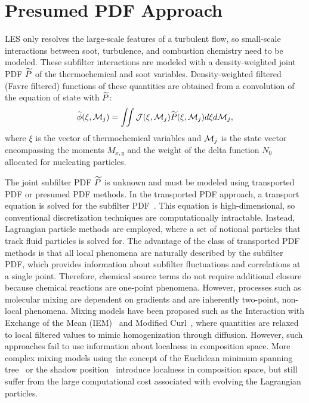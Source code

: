 \section{Presumed PDF Approach}
\label{sec:lesmodels:presumedpdf}

LES only resolves the large-scale features of a turbulent flow, so small-scale interactions between soot, turbulence, and combustion chemistry need to be modeled. These subfilter interactions are modeled with a density-weighted joint PDF $\widetilde{P}$ of the thermochemical and soot variables. Density-weighted filtered (Favre filtered) functions of these quantities are obtained from a convolution of the equation of state with $\widetilde{P}$:
\begin{equation}\label{eq:lesmodels:presumedpdf:filteredfuncs}
  \widetilde{\phi}(\xi,\mathcal{M}_j) = \iint \mathcal{J}(\xi,\mathcal{M}_j)\widetilde{P}(\xi,\mathcal{M}_j) d\xi d\mathcal{M}_j,
\end{equation}
where $\xi$ is the vector of thermochemical variables and $\mathcal{M}_j$ is the state vector encompassing the moments $M_{x,y}$ and the weight of the delta function $N_0$ allocated for nucleating particles.

The joint subfilter PDF $\widetilde{P}$ is unknown and must be modeled using transported PDF or presumed PDF methods. In the transported PDF approach, a transport equation is solved for the subfilter PDF~\cite{pope1985,pope1991}. This equation is high-dimensional, so conventional discretization techniques are computationally intractable. Instead, Lagrangian particle methods are employed, where a set of notional particles that track fluid particles is solved for. The advantage of the class of transported PDF methods is that all local phenomena are naturally described by the subfilter PDF, which provides information about subfilter fluctuations and correlations at a single point. Therefore, chemical source terms do not require additional closure because chemical reactions are one-point phenomena. However, processes such as molecular mixing are dependent on gradients and are inherently two-point, non-local phenomena. Mixing models have been proposed such as the Interaction with Exchange of the Mean (IEM)~\cite{dopazo1974} and Modified Curl~\cite{janicka1979}, where quantities are relaxed to local filtered values to mimic homogenization through diffusion. However, such approaches fail to use information about localness in composition space. More complex mixing models using the concept of the Euclidean minimum spanning tree~\cite{subramaniam1998} or the shadow position~\cite{pope2013} introduce localness in composition space, but still suffer from the large computational cost associated with evolving the Lagrangian particles.

